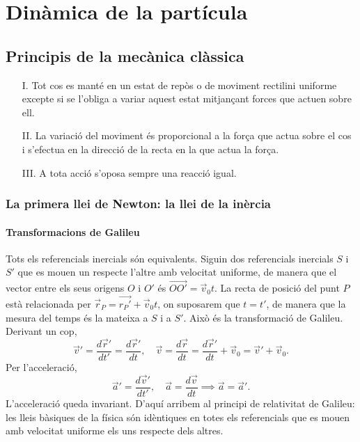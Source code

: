 \chapter{Dinàmica de la partícula}

\section{Principis de la mecànica clàssica}
\begin{itemize}
\item[I.] Tot cos es manté en un estat de repòs o de moviment rectilini uniforme excepte si se l'obliga a variar aquest estat mitjançant forces que actuen sobre ell.
\item[II.] La variació del moviment és proporcional a la força que actua sobre el cos i s'efectua en la direcció de la recta en la que actua la força.
\item[III.] A tota acció s'oposa sempre una reacció igual.
\end{itemize}
\subsection{La primera llei de Newton: la llei de la inèrcia}
\subsubsection{Transformacions de Galileu}
Tots els referencials inercials són equivalents. Siguin dos referencials inercials $S$ i $S'$ que es mouen un respecte l'altre amb velocitat uniforme, de manera que el vector entre els seus origens $O$ i $O'$ és $\vec{OO'}=\vec v_0 t$. La recta de posició del punt $P$ està relacionada per $\vec r_P=\vec{r_{P}'}+\vec v_0  t$, on suposarem que $t=t'$, de manera que la mesura del temps és la mateixa a $S$ i a $S'$. Això és la transformació de Galileu. Derivant un cop,
\[\vec v'=\dfrac{d\vec r'}{dt'}=\dfrac{d\vec r'}{dt},\quad \vec v=\dfrac{d\vec r}{dt}=\dfrac{d\vec r'}{dt}+\vec v_0=\vec v' + \vec v_0.\]
Per l'acceleració,
\[\vec a'=\dfrac{d\vec v'}{dt'},\quad \vec a=\dfrac{d\vec v}{dt}\implies\vec a=\vec a'.\]
L'acceleració queda invariant. D'aquí arribem al principi de relativitat de Galileu: les lleis bàsiques de la física són idèntiques en totes els referencials que es mouen amb velocitat uniforme els uns respecte dels altres.

